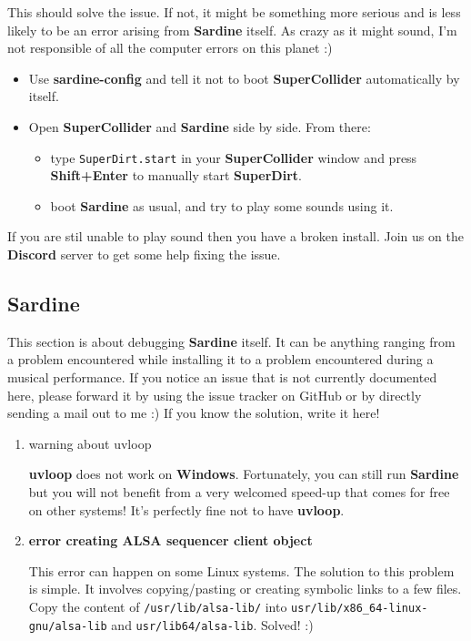 \documentclass[11pt]{article}
\begin{document}
This should solve the issue. If not, it might be something more serious and is less likely to be an error arising from \textbf{Sardine} itself. As crazy as it might sound, I'm not responsible of all the computer errors on this planet :)

\begin{itemize}
\item Use \textbf{sardine-config} and tell it not to boot \textbf{SuperCollider} automatically by itself.
\item Open \textbf{SuperCollider} and \textbf{Sardine} side by side. From there:
\begin{itemize}
\item type \texttt{SuperDirt.start} in your \textbf{SuperCollider} window and press \textbf{Shift+Enter} to manually start \textbf{SuperDirt}.
\item boot \textbf{Sardine} as usual, and try to play some sounds using it.
\end{itemize}
\end{itemize}

If you are stil unable to play sound then you have a broken install. Join us on the \textbf{Discord} server to get some help fixing the issue.

\subsection{Sardine}
\label{sec:org989d273}

This section is about debugging \textbf{Sardine} itself. It can be anything ranging from a problem encountered while installing it to a problem encountered during a musical performance. If you notice an issue that is not currently documented here, please forward it by using the issue tracker on GitHub or by directly sending a mail out to me :) If you know the solution, write it here!

\begin{enumerate}
\item warning about uvloop
\label{sec:orge1ec68c}

\textbf{\textbf{uvloop}} does not work on \textbf{Windows}. Fortunately, you can still run \textbf{Sardine} but you will not benefit from a very welcomed speed-up that comes for free on other systems! It's perfectly fine not to have \textbf{uvloop}.

\item \textbf{error creating ALSA sequencer client object}
\label{sec:org2eb47a5}

This error can happen on some Linux systems. The solution to this problem is simple. It involves copying/pasting or creating symbolic links to a few files. Copy the content of \texttt{/usr/lib/alsa-lib/} into \texttt{usr/lib/x86\_64-linux-gnu/alsa-lib} and \texttt{usr/lib64/alsa-lib}. Solved! :)
\end{enumerate}
\end{document}
